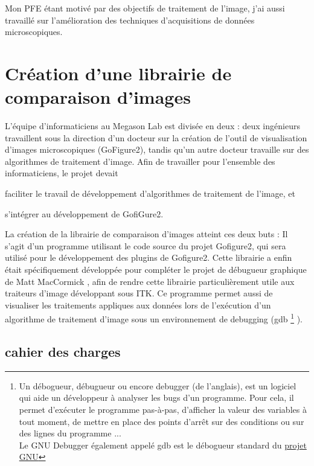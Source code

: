 Mon PFE étant motivé par des objectifs de traitement de l'image, j'ai aussi travaillé sur l'amélioration
 des techniques d'acquisitions de données microscopiques.



\section{Création d'une librairie de comparaison d'images}

L'équipe d'informaticiens au Megason Lab est divisée en deux : deux ingénieurs travaillent sous la direction d'un docteur sur la
 création de l'outil de visualisation d'images microscopiques (GoFigure2), tandis qu'un autre docteur travaille sur
 des algorithmes de traitement d'image. Afin de travailler pour l'ensemble des informaticiens, le projet devait
\begin{inparaenum}[(i)]
  \item faciliter le travail de développement d'algorithmes de traitement de l'image, et 
  \item s'intégrer au développement de GofiGure2.
\end{inparaenum}

La création de la librairie de comparaison d'images atteint ces deux buts : 
Il s'agit d'un programme utilisant le code source du projet Gofigure2, 
qui sera utilisé pour le développement des plugins de Gofigure2.
Cette librairie a enfin était spécifiquement développée pour compléter le projet de débugueur graphique de 
Matt MacCormick \cite{McCornic-VisualDebug}, afin de rendre cette librairie particulièrement utile
aux traiteurs d'image développant sous ITK.
Ce programme permet aussi de visualiser les traitements appliques aux données
lors de l'exécution d'un algorithme de traitement d'image sous un environnement de debugging (gdb
\footnote{Un débogueur, débugueur ou encore debugger (de l'anglais), est un logiciel qui aide un développeur à analyser les bugs d'un programme. Pour cela, il permet d'exécuter le programme pas-à-pas, d'afficher la valeur des variables à tout moment, de mettre en place des points d'arrêt sur des conditions ou sur des lignes du programme ...\\
Le GNU Debugger également appelé gdb est le débogueur standard du \href{http://fr.wikipedia.org/wiki/Projet_GNU}{projet GNU} } ).


\subsection{cahier des charges}


